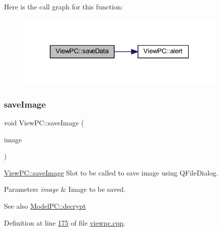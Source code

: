 Here is the call graph for this function\+:
\nopagebreak
\begin{figure}[H]
\begin{center}
\leavevmode
\includegraphics[width=289pt]{class_view_p_c_aaff156103970be7c777beedaf0020604_cgraph}
\end{center}
\end{figure}
\mbox{\label{class_view_p_c_a7901ce10ffaaf2387bef1db7feea342d}} 
\subsubsection{\texorpdfstring{save\+Image}{saveImage}}
{\footnotesize\ttfamily void View\+P\+C\+::save\+Image (\begin{DoxyParamCaption}\item[{Q\+Image $\ast$}]{image }\end{DoxyParamCaption})\hspace{0.3cm}{\ttfamily [slot]}}



\mbox{\hyperlink{class_view_p_c_a7901ce10ffaaf2387bef1db7feea342d}{View\+P\+C\+::save\+Image}} Slot to be called to save image using Q\+File\+Dialog. 


\begin{DoxyParams}{Parameters}
{\em image} & Image to be saved. \\
\hline
\end{DoxyParams}
\begin{DoxySeeAlso}{See also}
\mbox{\hyperlink{class_model_p_c_af1f0b21565bf39808c4cdd448fad0ea8}{Model\+P\+C\+::decrypt}} 
\end{DoxySeeAlso}


Definition at line \mbox{\hyperlink{viewpc_8cpp_source_l00175}{175}} of file \mbox{\hyperlink{viewpc_8cpp_source}{viewpc.\+cpp}}.

